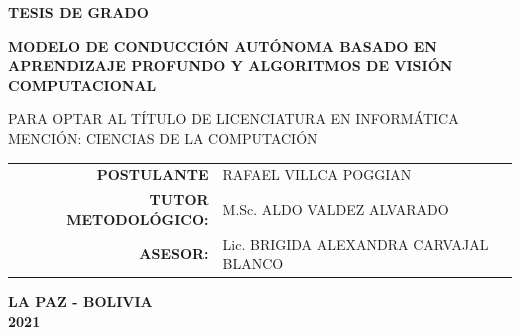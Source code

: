 \begin{titlepage}
\begin{center}
		\begin{spacing}{1.5}
			{\large \textbf{TESIS DE GRADO}}
		\end{spacing}
		\vspace{6mm}
		
		\begin{spacing}{1}
			{\large \textbf{MODELO DE CONDUCCIÓN AUTÓNOMA BASADO EN APRENDIZAJE PROFUNDO Y ALGORITMOS DE VISIÓN COMPUTACIONAL}}
		\end{spacing}
		\vspace{6mm}
		
		\begin{spacing}{1.3}
			{\textsc{PARA OPTAR AL TÍTULO DE LICENCIATURA EN INFORMÁTICA}}\\
			{\textsc{MENCIÓN: CIENCIAS DE LA COMPUTACIÓN}}
		\end{spacing}
		\vspace{6mm}
		
		\begin{spacing}{1.3}
			\begin{tabular}{rl}
				\textbf{POSTULANTE} & RAFAEL VILLCA POGGIAN\\
				\textbf{TUTOR METODOLÓGICO:} & M.Sc. ALDO VALDEZ ALVARADO\\
				\textbf{ASESOR:} & Lic. BRIGIDA ALEXANDRA CARVAJAL BLANCO \\
			\end{tabular}
		\end{spacing}
		\vspace{6mm}
		
		\begin{spacing}{1.3}
			\textbf{LA PAZ - BOLIVIA}\\
			\textbf{2021}
		\end{spacing}
		
	\end{center}
	
	
	
\end{titlepage}